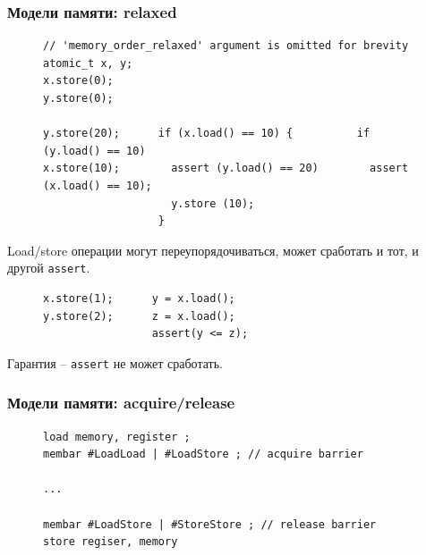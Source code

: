 \documentclass[aspectratio=169, pdf, 8pt, unicode]{beamer}
\begin{document}
\begin{frame}[fragile]
\frametitle{Модели памяти: relaxed}
\begin{figure}[H]
\begin{BVerbatim}
// 'memory_order_relaxed' argument is omitted for brevity
atomic_t x, y;
x.store(0);
y.store(0);

y.store(20);      if (x.load() == 10) {          if (y.load() == 10)
x.store(10);        assert (y.load() == 20)        assert (x.load() == 10);
                    y.store (10);
                  }
\end{BVerbatim}
\end{figure}
Load/store операции могут переупорядочиваться, может сработать и тот, и другой \texttt{assert}.
\begin{figure}[H]
\begin{BVerbatim}
x.store(1);      y = x.load();
y.store(2);      z = x.load();
                 assert(y <= z);
\end{BVerbatim}
\end{figure}
Гарантия -- \texttt{assert} не может сработать.
\end{frame}

\begin{frame}[fragile]
\frametitle{Модели памяти: acquire/release}
\begin{figure}[H]
\begin{BVerbatim}
load memory, register ;
membar #LoadLoad | #LoadStore ; // acquire barrier

...

membar #LoadStore | #StoreStore ; // release barrier
store regiser, memory
\end{BVerbatim}
\end{figure}
\end{frame}
\end{document}
